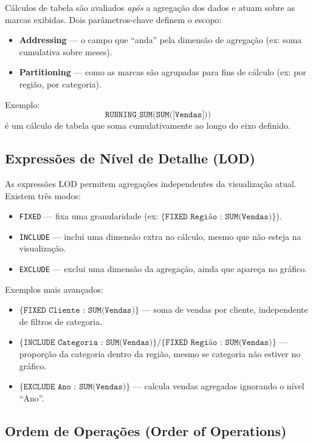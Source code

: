 Cálculos de tabela são avaliados \textit{após} a agregação dos dados e atuam sobre as marcas exibidas. Dois parâmetros-chave definem o escopo:

\begin{itemize}[leftmargin=*]
  \item \textbf{Addressing} — o campo que “anda” pela dimensão de agregação (ex: soma cumulativa sobre meses).  
  \item \textbf{Partitioning} — como as marcas são agrupadas para fins de cálculo (ex: por região, por categoria).  
\end{itemize}

Exemplo:  
\[
\texttt{RUNNING\_SUM(SUM([Vendas]))}
\]  
é um cálculo de tabela que soma cumulativamente ao longo do eixo definido.

\subsection{Expressões de Nível de Detalhe (LOD)}

As expressões LOD permitem agregações independentes da visualização atual. Existem três modos:

\begin{itemize}[leftmargin=*]
  \item \texttt{FIXED} — fixa uma granularidade (ex: \(\{ \texttt{FIXED Região : SUM(Vendas)}\}\)).  
  \item \texttt{INCLUDE} — inclui uma dimensão extra no cálculo, mesmo que não esteja na visualização.  
  \item \texttt{EXCLUDE} — exclui uma dimensão da agregação, ainda que apareça no gráfico.
\end{itemize}

Exemplos mais avançados:

\begin{itemize}[leftmargin=*]
  \item \(\{ \texttt{FIXED Cliente : SUM(Vendas)}\}\) — soma de vendas por cliente, independente de filtros de categoria.  
  \item \(\{ \texttt{INCLUDE Categoria : SUM(Vendas)}\} / \{ \texttt{FIXED Região : SUM(Vendas)}\}\) — proporção da categoria dentro da região, mesmo se categoria não estiver no gráfico.  
  \item \(\{ \texttt{EXCLUDE Ano : SUM(Vendas)}\}\) — calcula vendas agregadas ignorando o nível “Ano”.
\end{itemize}

\subsection{Ordem de Operações (Order of Operations)}

